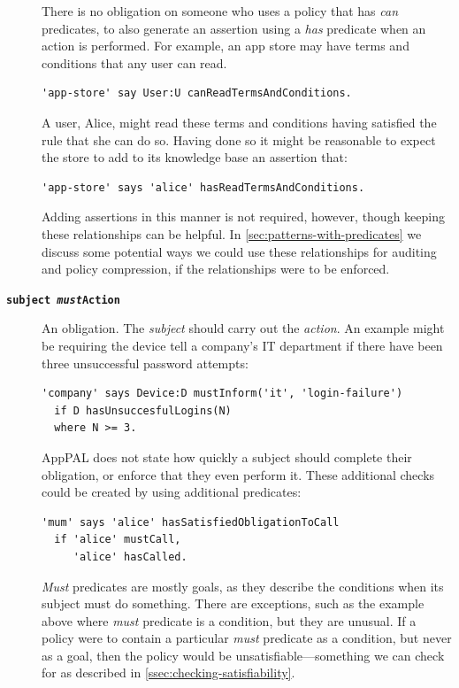 \documentclass[thesis.tex]{subfiles}
\begin{document}
\begin{description}
  There is no obligation on someone who uses a policy that has \emph{can}
  predicates, to also generate an assertion using a \emph{has} predicate
  when an action is performed.  For example, an app store may have terms
  and conditions that any user can read.
  \begin{lstlisting}
'app-store' say User:U canReadTermsAndConditions.
  \end{lstlisting}
  A user, Alice, might read these terms and conditions having satisfied
  the rule that she can do so.  Having done so it might be reasonable to
  expect the store to add to its knowledge base an assertion that:
  \begin{lstlisting}
'app-store' says 'alice' hasReadTermsAndConditions.   
  \end{lstlisting} Adding assertions in this manner is not required,
however, though keeping these relationships can be helpful. In
\autoref{sec:patterns-with-predicates} we discuss some potential ways
we could use these relationships for auditing and policy compression,
if the relationships were to be enforced.

\item[\bfseries\texttt{subject \emph{must}Action}]
  An obligation.  The \emph{subject} should carry out the \emph{action}.
  An example might be requiring the device tell a company's IT department if there have been three unsuccessful password attempts:

  \begin{minipage}{\linewidth}
  \begin{lstlisting}
'company' says Device:D mustInform('it', 'login-failure')
  if D hasUnsuccesfulLogins(N)
  where N >= 3.
  \end{lstlisting}
  \end{minipage}

  AppPAL does not state how quickly a subject should complete their obligation, or
  enforce that they even perform it.  These additional checks could be created
  by using additional predicates:

  \begin{lstlisting}
'mum' says 'alice' hasSatisfiedObligationToCall
  if 'alice' mustCall,
     'alice' hasCalled.
  \end{lstlisting}

  \emph{Must} predicates are mostly goals, as they describe the conditions when
  its subject must do something.  There are exceptions, such as the example
  above where \emph{must} predicate is a condition, but they are unusual.  If a policy were to contain a particular \emph{must} predicate as a condition, but never as a goal, then the policy would be unsatisfiable---something we can check for as described in \autoref{ssec:checking-satisfiability}.
\end{description}
\end{document}
